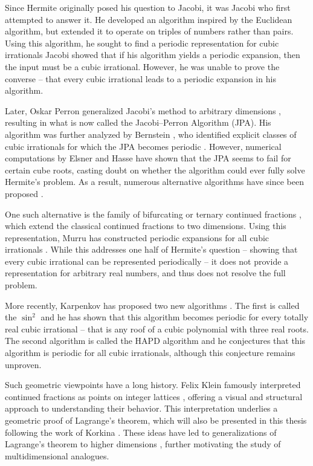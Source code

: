 Since Hermite originally posed his question to Jacobi, it was Jacobi who first attempted to answer it.
He developed an algorithm inspired by the Euclidean algorithm,
but extended it to operate on triples of numbers rather than pairs.
Using this algorithm, he sought to find a periodic representation for cubic irrationals
Jacobi showed that if his algorithm yields a periodic expansion,
then the input must be a cubic irrational.
However, he was unable to prove the converse -- that every cubic irrational leads to a periodic expansion in his algorithm.

Later, Oskar Perron generalized Jacobi's method to arbitrary dimensions \cite{Perron07},
resulting in what is now called the Jacobi–Perron Algorithm (JPA).
His algorithm was further analyzed by Bernstein \cite{Bernstein71},
who identified explicit classes of cubic irrationals for which the JPA
becomes periodic \cite{Bernstein64A, Bernstein65, Bernstein64B}.
However, numerical computations by Elsner and Hasse \cite{Elsner67} have shown
that the JPA seems to fail for certain cube roots,
casting doubt on whether the algorithm could ever fully solve Hermite’s
problem.
As a result, numerous alternative algorithms have since been proposed
\cite{Schweiger00, Hendy81, Schweiger13}.

One such alternative is the family of bifurcating or ternary continued
fractions \cite{Gupta00},
which extend the classical continued fractions to two dimensions.
Using this representation, Murru has constructed periodic expansions for all cubic irrationals \cite{Murru15}.
While this addresses one half of Hermite’s question -- showing that every cubic
irrational can be represented periodically -- it does not provide a
representation for arbitrary real numbers, and thus does not resolve the full
problem.

More recently, Karpenkov has proposed two new algorithms \cite{Karpenkov21, Karpenkov24}.
The first is called the $\sin^2$ and he has shown that this algorithm
becomes periodic for every totally real cubic irrational -- that is any roof of
a cubic polynomial with three real roots.
The second algorithm is called the HAPD algorithm \cite{Karpenkov24} and he
conjectures that this algorithm is periodic for all cubic irrationals,
although this conjecture remains unproven.

Such geometric viewpoints have a long history. Felix Klein famously interpreted
continued fractions as points on integer lattices \cite{Klein95}, offering
a visual and structural approach to understanding their behavior.
This interpretation underlies a geometric proof of Lagrange’s theorem, which will
also be presented in this thesis following the work of Korkina \cite{Korkina96}.
These ideas have led to generalizations of Lagrange’s theorem
to higher dimensions \cite{German08}, further motivating the study of
multidimensional analogues.

